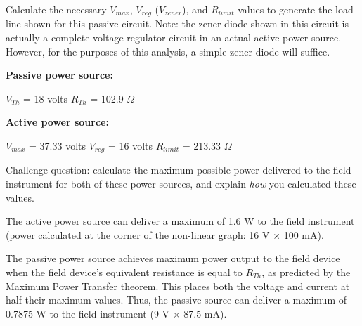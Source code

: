 Calculate the necessary $V_{max}$, $V_{reg}$ ($V_{zener}$), and $R_{limit}$ values to generate the load line shown for this passive circuit.  Note: the zener diode shown in this circuit is actually a complete voltage regulator circuit in an actual active power source.  However, for the purposes of this analysis, a simple zener diode will suffice.







\noindent
{\bf Passive power source:}

$V_{Th}$ = 18 volts \hskip 50pt $R_{Th}$ = 102.9 $\Omega$

\vskip 10pt

\noindent
{\bf Active power source:}

$V_{max}$ = 37.33 volts \hskip 50pt $V_{reg}$ = 16 volts \hskip 50pt $R_{limit}$ = 213.33 $\Omega$

\vskip 10pt

Challenge question: calculate the maximum possible power delivered to the field instrument for both of these power sources, and explain {\it how} you calculated these values.







The active power source can deliver a maximum of 1.6 W to the field instrument (power calculated at the corner of the non-linear graph: 16 V $\times$ 100 mA).

The passive power source achieves maximum power output to the field device when the field device's equivalent resistance is equal to $R_{Th}$, as predicted by the Maximum Power Transfer theorem.  This places both the voltage and current at half their maximum values.  Thus, the passive source can deliver a maximum of 0.7875 W to the field instrument (9 V $\times$ 87.5 mA).




